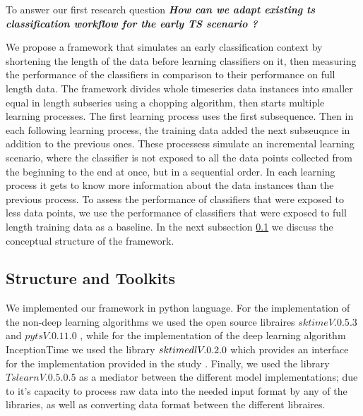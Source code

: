 
To answer our first research question \textbf{\textit{How can we adapt existing ts classification workflow for the early TS scenario ?}}

We propose a framework that simulates an early classification context by shortening the length of the data before learning classifiers on it,
then measuring the performance of the classifiers in comparison to their performance on full length data.
The framework divides whole timeseries data instances into smaller equal in length subseries using a chopping algorithm, then starts multiple learning processes.
The first learning process uses the first subsequence.
Then in each following learning process, the training data added the next subseuqnce in addition to the previous ones.
These processess simulate an incremental learning scenario, where the classifier is not exposed to all the data points collected from the beginning to the end at once, but in a sequential order.
In each learning process it gets to know more information about the data instances than the previous process.
To assess the performance of classifiers that were exposed to less data points, we use the performance of classifiers that were exposed to full length training data as a baseline.
In the next subsection \ref{SubsectionFrameworkStructureToolkits} we discuss the conceptual structure of the framework.


\subsection{Structure and Toolkits}
\label{SubsectionFrameworkStructureToolkits}
We implemented our framework in python language.
For the implementation of the non-deep learning algorithms we used the open source libraires $sktime V. 0.5.3$ \cite{loning2019sktime} and $pyts V. 0.11.0$ \cite{JMLR:v21:19-763},
while for the implementation of the deep learning algorithm InceptionTime we used the library $sktime\-dl V .0.2.0$ which provides an interface for the implementation provided
in the study \cite{fawaz2020inceptiontime}. Finally, we used the library $Tslearn V. 0.5.0.5$ \cite{JMLR:v21:20-091} as a mediator between the different model implementations; due to it's
capacity to process raw data into the needed input format by any of the libraries, as well as converting data format between the different libraires.

